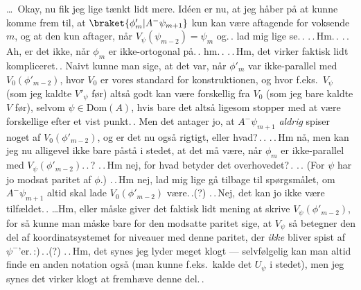 \documentclass{report}
\begin{document}
\ldots\ Okay, nu fik jeg lige tænkt lidt mere. Idéen er nu, at jeg håber på at kunne komme frem til, at $\braket{\phi'_{m} | A^- \psi_{m+1}}$ kun kan være aftagende for voksende $m$, og at den kun aftager, når $V_{\psi}(\psi_{m-2})= \psi_{m}$ og.\,. lad mig lige se.\,. .\,.\,Hm.\,. .\,.\,Ah, er det ikke, når $\phi_m$ er ikke-ortogonal på.\,. hm.\,. .\,.\,Hm, det virker faktisk lidt kompliceret.\,. Naivt kunne man sige, at det var, når $\phi'_m$ var ikke-parallel med $V_0(\phi'_{m-2})$, hvor $V_0$ er vores standard for konstruktionen, og hvor f.eks.\ $V_\psi$ (som jeg kaldte $V'_\psi$ før) altså godt kan være forskellig fra $V_0$ (som jeg bare kaldte $V$ før), selvom $\psi\in\mathrm{Dom}(A)$, hvis bare det altså ligesom stopper med at være forskellige efter et vist punkt.\,. Men det antager jo, at $A^- \psi_{m+1}$ \emph{aldrig} spiser noget af $V_0(\phi'_{m-2})$, og er det nu også rigtigt, eller hvad?\,.\,. .\,.\,Hm nå, men kan jeg nu alligevel ikke bare påstå i stedet, at det må være, når $\phi_m$ er ikke-parallel med $V_\psi(\phi'_{m-2})$.\,.\,? .\,.\,Hm nej, for hvad betyder det overhovedet?\,. .\,. (For $\psi$ har jo modsat paritet af $\phi$.) .\,.\,Hm nej, lad mig lige gå tilbage til spørgsmålet, om $A^- \psi_{m+1}$ altid skal lade $V_0(\phi'_{m-2})$ være.\,.(?) .\,.\,Nej, det kan jo ikke være tilfældet.\,. 
\ldots Hm, eller måske giver det faktisk lidt mening at skrive $V_\psi(\phi'_{m-2})$, for så kunne man måske bare for den modsatte paritet sige, at $V_\psi$ så betegner den del af koordinatsystemet for niveauer med denne paritet, der \emph{ikke} bliver spist af $\psi^-$'er.\,:)\,.\,.(?) .\,.\,Hm, det synes jeg lyder meget klogt --- selvfølgelig kan man altid finde en anden notation også (man kunne f.eks.\ kalde det $U_\psi$ i stedet), men jeg synes det virker klogt at fremhæve denne del.\,. 
\end{document}
